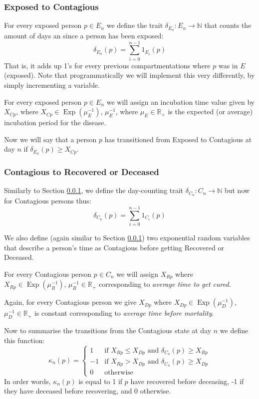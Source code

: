 \documentclass{article}
\newcommand*{\posreal}{\mathbb{R}_+}
\DeclareMathOperator{\Exp}{Exp}
\begin{document}
\subsubsection{Exposed to Contagious}\label{sec:exp-to-cont}
For every exposed person \(p \in E_n\) we define the trait \(\delta_{E_n} : E_n \rightarrow \mathbb{N}\) that counts the amount of days an since a person has been exposed:
\[
    \delta_{E_n}(p) = \sum_{i=0}^{n-1} 1_{E_i}(p)
\]
That is, it adds up 1's for every previous compartmentations where \(p\) was in \(E\) (exposed). Note that programmatically we will implement this very differently, by simply incrementing a variable.

For every exposed person \(p \in E_n\) we will assign an incubation time value given by \(X_{Cp}\), where \(X_{Cp} \in \Exp(\mu_E^{-1})\), \(\mu_E^{-1}\), where \(\mu_E \in \posreal\) is the expected (or average) incubation period for the disease.

Now we will say that a person \(p\) has transitioned from Exposed to Contagious at day \(n\) if \(\delta_{E_n}(p) \geq X_{Cp}\).

\subsubsection{Contagious to Recovered or Deceased}
Similarly to Section \ref{sec:exp-to-cont}, we define the day-counting trait \(\delta_{C_n} : C_n \rightarrow \mathbb{N}\) but now for Contagious persons thus:
\[
    \delta_{C_n}(p) = \sum_{i=0}^{n-1} 1_{C_i}(p)
\]

We also define (again similar to Section \ref{sec:exp-to-cont}) two exponential random variables that describe a person's time as Contagious before getting Recovered or Deceased. 

For every Contagious person \(p \in C_n\) we will assign \(X_{Rp}\) where \(X_{Rp} \in \Exp(\mu_R^{-1})\), \(\mu_R^{-1} \in \posreal\) corresponding to \emph{average time to get cured}.

Again, for every Contagious person we give \(X_{Dp}\) where \(X_{Dp} \in \Exp(\mu_D^{-1})\), \(\mu_D^{-1} \in \posreal\) is constant corresponding to \emph{average time before mortality}.

Now to summarise the transitions from the Contagious state at day \(n\) we define this function:
\[
\kappa_n(p)=
\begin{cases}
    1 & \text{if \(X_{Rp} \leq X_{Dp}\) and \(\delta_{C_n}(p) \geq X_{Rp}\)} \\
    -1 & \text{if \(X_{Rp} > X_{Dp}\) and \(\delta_{C_n}(p) \geq X_{Dp}\)} \\
    0 & \text{otherwise}
\end{cases}
\]
In order words, \(\kappa_n(p)\) is equal to 1 if \(p\) have recovered before deceasing, -1 if they have deceased before recovering, and 0 otherwise.
\end{document}
